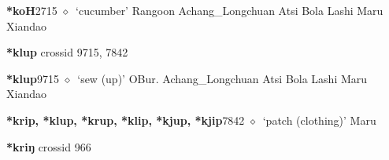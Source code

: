   \begin{list}{}{\leftmargin=1.5em \itemindent=-1.5em}
  \item {\footnotesize \textbf{*koH}}{\tiny 2715}
         $\diamond$~`cucumber'
         Rangoon 
\hspace{1ex}
         Achang\_Longchuan 
\hspace{1ex}
         Atsi 
\hspace{1ex}
         Bola 
\hspace{1ex}
         Lashi 
\hspace{1ex}
         Maru 
\hspace{1ex}
         Xiandao 
  \end{list}
\item
\textbf{*klup}
  {\tiny crossid 9715, 7842}
  \begin{list}{}{\leftmargin=1.5em \itemindent=-1.5em}
  \item {\footnotesize \textbf{*klup}}{\tiny 9715}
         $\diamond$~`sew (up)'
         OBur. 
\hspace{1ex}
         Achang\_Longchuan 
\hspace{1ex}
         Atsi 
\hspace{1ex}
         Bola 
\hspace{1ex}
         Lashi 
\hspace{1ex}
         Maru 
\hspace{1ex}
         Xiandao 
  \item {\footnotesize \textbf{*krip, *klup, *krup, *klip, *kjup, *kjip}}{\tiny 7842}
\hspace{1ex}
         $\diamond$~`patch (clothing)'
         Maru 
  \end{list}
\item
\textbf{*kriŋ}
  {\tiny crossid 966}
